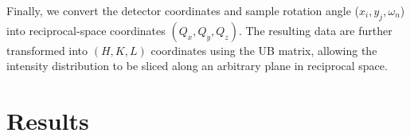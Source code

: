 \documentclass[%
 reprint,
superscriptaddress,
 amsmath,amssymb,
 aps,
floatfix,
]{revtex4-2}
\begin{document}
Finally, we convert the detector coordinates and sample rotation angle ($x_i,y_j, \omega_n$) into reciprocal-space coordinates $(Q_x,Q_y,Q_z)$.
The resulting data are further transformed into $(H,K,L)$ coordinates using the UB matrix, allowing the intensity distribution to be sliced along an arbitrary plane in reciprocal space.


\section{Results}
\end{document}
